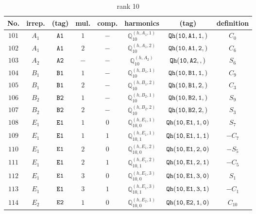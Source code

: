 \documentclass[fleqn,8pt]{jsarticle}
\begin{document}
\begin{table}[ht!]
\begin{center}
\caption{rank 10}
\renewcommand{\arraystretch}{1.3}
\begin{tabular}{cccccccc} \hline \hline
No. & irrep. & (tag) & mul. & comp. & harmonics & (tag) & definition \\ \hline
$ 101 $ & $ A_{1} $ & $ {\tt A1} $ & $ 1 $ & $ - $ & $ \mathbb{Q}_{10}^{(h,A_{1},1)} $ & $ {\tt Qh(10,A1,1,)} $ & $ C_{0} $ \\
$ 102 $ & $ A_{1} $ & $ {\tt A1} $ & $ 2 $ & $ - $ & $ \mathbb{Q}_{10}^{(h,A_{1},2)} $ & $ {\tt Qh(10,A1,2,)} $ & $ C_{6} $ \\
$ 103 $ & $ A_{2} $ & $ {\tt A2} $ & $ - $ & $ - $ & $ \mathbb{Q}_{10}^{(h,A_{2})} $ & $ {\tt Qh(10,A2,,)} $ & $ S_{6} $ \\
$ 104 $ & $ B_{1} $ & $ {\tt B1} $ & $ 1 $ & $ - $ & $ \mathbb{Q}_{10}^{(h,B_{1},1)} $ & $ {\tt Qh(10,B1,1,)} $ & $ C_{9} $ \\
$ 105 $ & $ B_{1} $ & $ {\tt B1} $ & $ 2 $ & $ - $ & $ \mathbb{Q}_{10}^{(h,B_{1},2)} $ & $ {\tt Qh(10,B1,2,)} $ & $ C_{3} $ \\
$ 106 $ & $ B_{2} $ & $ {\tt B2} $ & $ 1 $ & $ - $ & $ \mathbb{Q}_{10}^{(h,B_{2},1)} $ & $ {\tt Qh(10,B2,1,)} $ & $ S_{9} $ \\
$ 107 $ & $ B_{2} $ & $ {\tt B2} $ & $ 2 $ & $ - $ & $ \mathbb{Q}_{10}^{(h,B_{2},2)} $ & $ {\tt Qh(10,B2,2,)} $ & $ S_{3} $ \\
$ 108 $ & $ E_{1} $ & $ {\tt E1} $ & $ 1 $ & $ 0 $ & $ \mathbb{Q}_{10,0}^{(h,E_{1},1)} $ & $ {\tt Qh(10,E1,1,0)} $ & $ S_{7} $ \\
$ 109 $ & $ E_{1} $ & $ {\tt E1} $ & $ 1 $ & $ 1 $ & $ \mathbb{Q}_{10,1}^{(h,E_{1},1)} $ & $ {\tt Qh(10,E1,1,1)} $ & $ - C_{7} $ \\
$ 110 $ & $ E_{1} $ & $ {\tt E1} $ & $ 2 $ & $ 0 $ & $ \mathbb{Q}_{10,0}^{(h,E_{1},2)} $ & $ {\tt Qh(10,E1,2,0)} $ & $ - S_{5} $ \\
$ 111 $ & $ E_{1} $ & $ {\tt E1} $ & $ 2 $ & $ 1 $ & $ \mathbb{Q}_{10,1}^{(h,E_{1},2)} $ & $ {\tt Qh(10,E1,2,1)} $ & $ - C_{5} $ \\
$ 112 $ & $ E_{1} $ & $ {\tt E1} $ & $ 3 $ & $ 0 $ & $ \mathbb{Q}_{10,0}^{(h,E_{1},3)} $ & $ {\tt Qh(10,E1,3,0)} $ & $ S_{1} $ \\
$ 113 $ & $ E_{1} $ & $ {\tt E1} $ & $ 3 $ & $ 1 $ & $ \mathbb{Q}_{10,1}^{(h,E_{1},3)} $ & $ {\tt Qh(10,E1,3,1)} $ & $ - C_{1} $ \\
$ 114 $ & $ E_{2} $ & $ {\tt E2} $ & $ 1 $ & $ 0 $ & $ \mathbb{Q}_{10,0}^{(h,E_{2},1)} $ & $ {\tt Qh(10,E2,1,0)} $ & $ C_{10} $ \\

\end{tabular}
\end{center}
\end{table}
\end{document}
